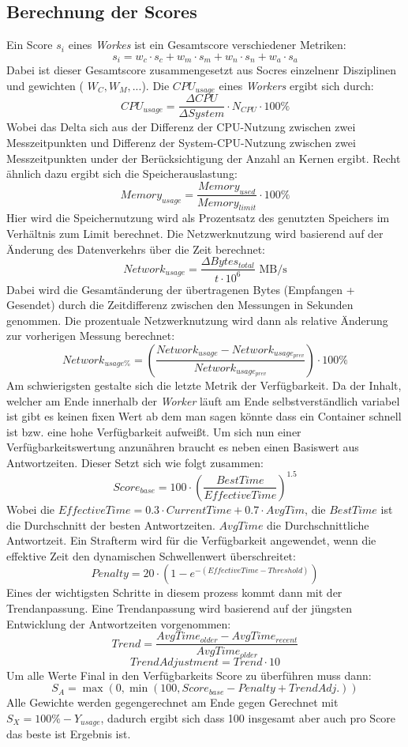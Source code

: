 \documentclass[twocolumn]{webofc}
\begin{document}
\subsection{Berechnung der Scores}
Ein Score \( s_i \) eines \textit{Workes} ist ein Gesamtscore verschiedener Metriken:
$$s_i = w_c \cdot s_c + w_m \cdot s_m + w_n \cdot s_n + w_a \cdot s_a$$
Dabei ist dieser Gesamtscore zusammengesetzt aus Socres einzelnenr Disziplinen und gewichten ( \( W_C, W_M, ... \)). Die  \( CPU_{usage} \) eines \textit{Workers} ergibt sich durch:
$$CPU_{usage} = \frac{\Delta CPU}{\Delta System} \cdot N_{CPU} \cdot 100\%$$
Wobei das Delta sich aus der Differenz der CPU-Nutzung zwischen zwei Messzeitpunkten und Differenz der System-CPU-Nutzung zwischen zwei Messzeitpunkten under der Berücksichtigung der Anzahl an Kernen ergibt. Recht ähnlich dazu ergibt sich die Speicherauslastung:
$$Memory_{usage} = \frac{Memory_{used}}{Memory_{limit}} \cdot 100\%$$
Hier wird die Speichernutzung wird als Prozentsatz des genutzten Speichers im Verhältnis zum Limit berechnet. Die Netzwerknutzung wird basierend auf der Änderung des Datenverkehrs über die Zeit berechnet:
$$Network_{usage} = \frac{\Delta Bytes_{total}}{t \cdot 10^6} \text{ MB/s}$$
Dabei wird die Gesamtänderung der übertragenen Bytes (Empfangen + Gesendet)
durch die Zeitdifferenz zwischen den Messungen in Sekunden genommen. Die prozentuale Netzwerknutzung wird dann als relative Änderung zur vorherigen Messung berechnet:
$$Network_{usage\%} = \left(\frac{Network_{usage} - Network_{usage_{prev}}}{Network_{usage_{prev}}}\right) \cdot 100\%$$
Am schwierigsten gestalte sich die letzte Metrik der Verfügbarkeit. Da der Inhalt, welcher am Ende innerhalb der \textit{Worker} läuft am Ende selbstverständlich variabel ist gibt es keinen fixen Wert ab dem man sagen könnte dass ein Container schnell ist bzw. eine hohe Verfügbarkeit aufweißt. Um sich nun einer Verfügbarkeitswertung anzunähren braucht es neben einen Basiswert aus Antwortzeiten. Dieser Setzt sich wie folgt zusammen:
$$Score_{base} = 100 \cdot \left(\frac{BestTime}{EffectiveTime}\right)^{1.5}$$
Wobei die \( EffectiveTime = 0.3 \cdot CurrentTime + 0.7 \cdot AvgTim \), die \( BestTime \) ist die  Durchschnitt der besten Antwortzeiten. \( AvgTime \) die Durchschnittliche Antwortzeit. Ein Strafterm wird für die Verfügbarkeit angewendet, wenn die effektive Zeit den dynamischen Schwellenwert überschreitet:
$$Penalty = 20 \cdot (1 - e^{-(EffectiveTime - Threshold)})$$
Eines der wichtigsten Schritte in diesem prozess kommt dann mit der Trendanpassung.
Eine Trendanpassung wird basierend auf der jüngsten Entwicklung der Antwortzeiten vorgenommen:
$$Trend = \frac{AvgTime_{older} - AvgTime_{recent}}{AvgTime_{older}}$$
$$TrendAdjustment = Trend \cdot 10$$
Um alle Werte Final in den Verfügbarkeits Score zu überführen muss dann:
$$S_A = \max(0, \min(100, Score_{base} - Penalty + TrendAdj.))$$ Alle Gewichte werden gegengerechnet am Ende gegen Gerechnet mit \( S_X = 100\% - Y_{usage} \), dadurch ergibt sich dass 100 insgesamt aber auch pro Score das beste ist Ergebnis ist. 
\end{document}
